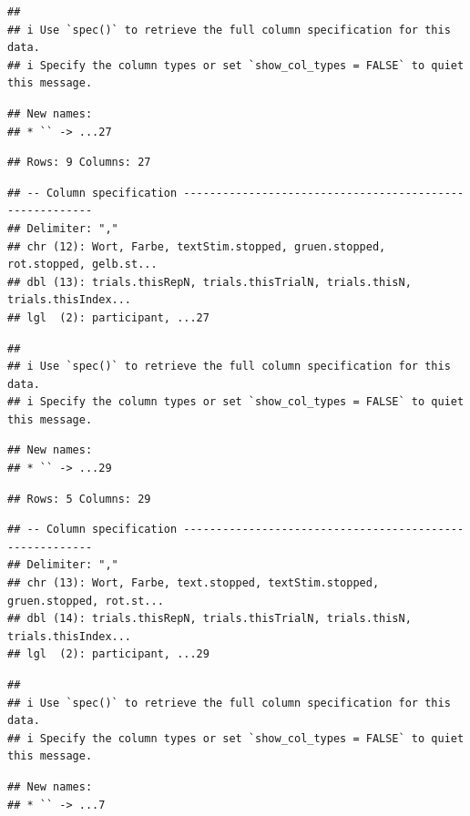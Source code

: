 \documentclass[
]{book}
\begin{document}
\begin{verbatim}
## 
## i Use `spec()` to retrieve the full column specification for this data.
## i Specify the column types or set `show_col_types = FALSE` to quiet this message.
\end{verbatim}

\begin{verbatim}
## New names:
## * `` -> ...27
\end{verbatim}

\begin{verbatim}
## Rows: 9 Columns: 27
\end{verbatim}

\begin{verbatim}
## -- Column specification --------------------------------------------------------
## Delimiter: ","
## chr (12): Wort, Farbe, textStim.stopped, gruen.stopped, rot.stopped, gelb.st...
## dbl (13): trials.thisRepN, trials.thisTrialN, trials.thisN, trials.thisIndex...
## lgl  (2): participant, ...27
\end{verbatim}

\begin{verbatim}
## 
## i Use `spec()` to retrieve the full column specification for this data.
## i Specify the column types or set `show_col_types = FALSE` to quiet this message.
\end{verbatim}

\begin{verbatim}
## New names:
## * `` -> ...29
\end{verbatim}

\begin{verbatim}
## Rows: 5 Columns: 29
\end{verbatim}

\begin{verbatim}
## -- Column specification --------------------------------------------------------
## Delimiter: ","
## chr (13): Wort, Farbe, text.stopped, textStim.stopped, gruen.stopped, rot.st...
## dbl (14): trials.thisRepN, trials.thisTrialN, trials.thisN, trials.thisIndex...
## lgl  (2): participant, ...29
\end{verbatim}

\begin{verbatim}
## 
## i Use `spec()` to retrieve the full column specification for this data.
## i Specify the column types or set `show_col_types = FALSE` to quiet this message.
\end{verbatim}

\begin{verbatim}
## New names:
## * `` -> ...7
\end{verbatim}
\end{document}
